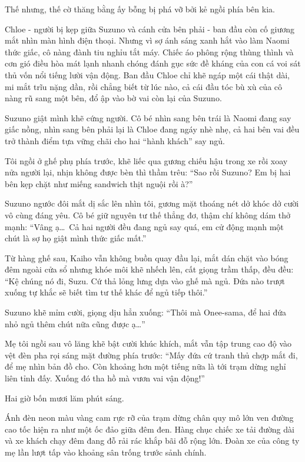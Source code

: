 \documentclass[../main.tex]{subfiles}
\begin{document}
Thế nhưng, thế cờ thăng bằng ấy bỗng bị phá vỡ bởi kẻ ngồi phía bên kia.

Chloe - người bị kẹp giữa Suzuno và cánh cửa bên phải - ban đầu còn cố giương mắt nhìn màn hình điện thoại. Nhưng vì sợ ánh sáng xanh hắt vào làm Naomi thức giấc, cô nàng đành tiu nghỉu tắt máy. Chiếc áo phông rộng thùng thình và cơn gió điều hòa mát lạnh nhanh chóng đánh gục sức đề kháng của con cá voi sát thủ vốn nổi tiếng lười vận động. Ban đầu Chloe chỉ khẽ ngáp một cái thật dài, mi mắt trĩu nặng dần, rồi chẳng biết từ lúc nào, cả cái đầu tóc bù xù của cô nàng rũ sang một bên, đổ ập vào bờ vai còn lại của Suzuno.

Suzuno giật mình khẽ cứng người. Cô bé nhìn sang bên trái là Naomi đang say giấc nồng, nhìn sang bên phải lại là Chloe đang ngáy nhè nhẹ, cả hai bên vai đều trở thành điểm tựa vững chãi cho hai ``hành khách'' say ngủ.

Tôi ngồi ở ghế phụ phía trước, khẽ liếc qua gương chiếu hậu trong xe rồi xoay nửa người lại, nhịn không được bèn thì thầm trêu: ``Sao rồi Suzuno? Em bị hai bên kẹp chặt như miếng sandwich thịt nguội rồi à?''

Suzuno ngước đôi mắt dị sắc lên nhìn tôi, gương mặt thoáng nét dở khóc dở cười vô cùng đáng yêu. Cô bé giữ nguyên tư thế thẳng đơ, thậm chí không dám thở mạnh: ``Vâng ạ\dots\ Cả hai người đều đang ngủ say quá, em cử động mạnh một chút là sợ họ giật mình thức giấc mất.''

Từ hàng ghế sau, Kaiho vẫn không buồn quay đầu lại, mắt dán chặt vào bóng đêm ngoài cửa sổ nhưng khóe môi khẽ nhếch lên, cất giọng trầm thấp, đều đều: ``Kệ chúng nó đi, Suzu. Cứ thả lỏng lưng dựa vào ghế mà ngủ. Đứa nào trượt xuống tự khắc sẽ biết tìm tư thế khác để ngủ tiếp thôi.''

Suzuno khẽ mỉm cười, giọng dịu hẳn xuống: ``Thôi mà Onee-sama, để hai đứa nhỏ ngủ thêm chút nữa cũng được ạ\dots''

Mẹ tôi ngồi sau vô lăng khẽ bật cười khúc khích, mắt vẫn tập trung cao độ vào vệt đèn pha rọi sáng mặt đường phía trước: ``Mấy đứa cứ tranh thủ chợp mắt đi, để mẹ nhìn bản đồ cho. Còn khoảng hơn một tiếng nữa là tới trạm dừng nghỉ liên tỉnh đấy. Xuống đó tha hồ mà vươn vai vận động!''

\ct

Hai giờ bốn mươi lăm phút sáng.

Ánh đèn neon màu vàng cam rực rỡ của trạm dừng chân quy mô lớn ven đường cao tốc hiện ra như một ốc đảo giữa đêm đen. Hàng chục chiếc xe tải đường dài và xe khách chạy đêm đang đỗ rải rác khắp bãi đỗ rộng lớn. Đoàn xe của công ty mẹ lần lượt tấp vào khoảng sân trống trước sảnh chính.
\end{document}
